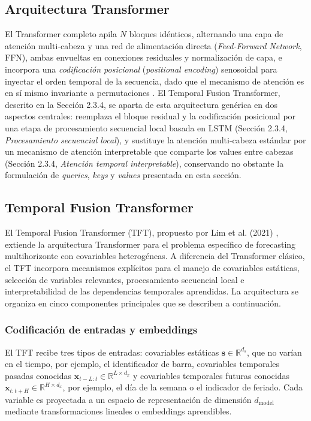 \subsection{Arquitectura Transformer}

El Transformer completo apila $N$ bloques idénticos, alternando una capa de atención multi-cabeza y una red de alimentación directa (\textit{Feed-Forward Network}, FFN), ambas envueltas en conexiones residuales y normalización de capa, e incorpora una \textit{codificación posicional} (\textit{positional encoding}) senosoidal para inyectar el orden temporal de la secuencia, dado que el mecanismo de atención es en sí mismo invariante a permutaciones \cite{Vaswani2017Attention}. El Temporal Fusion Transformer, descrito en la Sección 2.3.4, se aparta de esta arquitectura genérica en dos aspectos centrales: reemplaza el bloque residual y la codificación posicional por una etapa de procesamiento secuencial local basada en LSTM (Sección 2.3.4, \textit{Procesamiento secuencial local}), y sustituye la atención multi-cabeza estándar por un mecanismo de atención interpretable que comparte los values entre cabezas (Sección 2.3.4, \textit{Atención temporal interpretable}), conservando no obstante la formulación de \textit{queries}, \textit{keys} y \textit{values} presentada en esta sección.

\subsection{Temporal Fusion Transformer}

El Temporal Fusion Transformer (TFT), propuesto por Lim et al. (2021) \cite{TFT}, extiende la arquitectura Transformer para el problema específico de forecasting multihorizonte con covariables heterogéneas. A diferencia del Transformer clásico, el TFT incorpora mecanismos explícitos para el manejo de covariables estáticas, selección de variables relevantes, procesamiento secuencial local e interpretabilidad de las dependencias temporales aprendidas. La arquitectura se organiza en cinco componentes principales que se describen a continuación.

\subsubsection{Codificación de entradas y embeddings}

El TFT recibe tres tipos de entradas: covariables estáticas $\mathbf{s} \in \mathbb{R}^{d_s}$, que no varían en el tiempo, por ejemplo, el identificador de barra, covariables temporales pasadas conocidas $\mathbf{x}_{t-L:t} \in \mathbb{R}^{L \times d_x}$ y covariables temporales futuras conocidas $\mathbf{x}_{t:t+H} \in \mathbb{R}^{H \times d_x}$, por ejemplo, el día de la semana o el indicador de feriado. Cada variable es proyectada a un espacio de representación de dimensión $d_{\text{model}}$ mediante transformaciones lineales o embeddings aprendibles.

